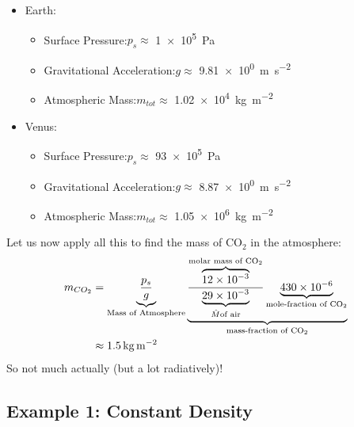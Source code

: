 \begin{multicols}{2}
\begin{itemize}
    \item Earth: 
    \begin{itemize}
        \item Surface Pressure:\newline $p_s\approx$ \qty{1e5}{\pascal}
        \item Gravitational Acceleration:\newline $g\approx$ \qty{9.81e0}{\metre\per\second\squared}
        \item Atmospheric Mass:\newline $m_{tot}\approx$ \qty{1.02e4}{\kilogram\per\metre\squared}
    \end{itemize}
    \item Venus: 
    \begin{itemize}
        \item Surface Pressure:\newline $p_s\approx$ \qty{93e5}{\pascal}
        \item Gravitational Acceleration:\newline $g\approx$ \qty{8.87e0}{\metre\per\second\squared}
        \item Atmospheric Mass:\newline $m_{tot}\approx$ \qty{1.05e6}{\kilogram\per\metre\squared}
    \end{itemize}
\end{itemize}
\end{multicols}
\noindent Let us now apply all this to find the mass of CO$_2$ in the atmosphere:
\begin{align*}
    m_{CO_2}&= \underbrace{\frac{p_s}{g}}_\text{Mass of Atmosphere} \underbrace{\frac{\overbrace{12\times10^{-3}}^{\text{molar mass of CO}_2}}{\underbrace{29\times10^{-3}}_{\hat{M} \text{of air}}} \underbrace{430 \times 10^{-6}}_{\text{mole-fraction of CO}_2}}_{\text{mass-fraction of CO}_2}\\
    &\approx\text{\qty{1.5}{\kilogram\per\meter\squared}}
\end{align*}
So not much actually (but a lot radiatively)!
\subsection{Example 1: Constant Density}

